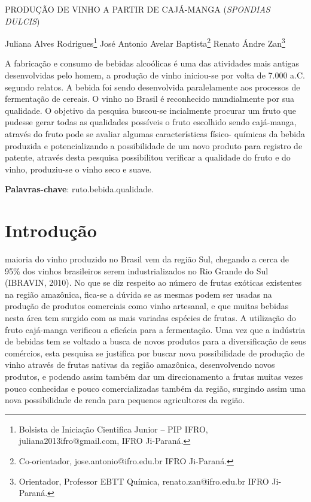 \documentclass[article,12pt,onesidea,4paper,english,brazil]{abntex2}
\begin{document}
	
	
	\frenchspacing 
	
	\begin{center}
		\LARGE PRODUÇÃO DE VINHO A PARTIR DE CAJÁ-MANGA (\textit{SPONDIAS DULCIS})
		
		\normalsize
		Juliana Alves Rodrigues\footnote{Bolsista de Iniciação Cientifica Junior – PIP IFRO, juliana2013ifro@gmail.com, IFRO Ji-Paraná.} 
		José Antonio Avelar Baptista\footnote{Co-orientador, jose.antonio@ifro.edu.br IFRO Ji-Paraná.} 
		Renato Ándre Zan\footnote{Orientador, Professor EBTT Química, renato.zan@ifro.edu.br IFRO Ji-Paraná.}  
	\end{center}
	
	\begin{resumoumacoluna}
		A fabricação e consumo de bebidas alcoólicas é uma das atividades mais antigas desenvolvidas pelo homem, a produção de vinho iniciou-se por volta de
		7.000 a.C. segundo relatos. A bebida foi sendo desenvolvida paralelamente aos processos de fermentação de cereais. O vinho no Brasil é reconhecido mundialmente por sua qualidade. O objetivo da pesquisa buscou-se incialmente procurar um fruto que pudesse gerar todas as qualidades possíveis o fruto escolhido sendo cajá-manga, através do fruto pode se avaliar algumas características físico- químicas da bebida produzida e potencializando a possibilidade de um novo produto para registro de patente, através desta pesquisa possibilitou verificar a qualidade do fruto e do vinho, produziu-se o vinho seco e suave.
		
		\vspace{\onelineskip}
		
		\noindent
		\textbf{Palavras-chave}: ruto.bebida.qualidade.
	\end{resumoumacoluna}
	
	\section*{Introdução}
	
	maioria do vinho produzido no Brasil vem da região Sul, chegando a cerca de 95\% dos vinhos brasileiros serem industrializados no Rio Grande do Sul (IBRAVIN, 2010). No que se diz respeito ao número de frutas exóticas existentes na região amazônica, fica-se a dúvida se as mesmas podem ser usadas na produção de produtos comerciais como vinho artesanal, e que muitas bebidas nesta área tem surgido com as mais variadas espécies de frutas. A utilização do fruto cajá-manga verificou a eficácia para a fermentação.
	Uma vez que a indústria de bebidas tem se voltado a busca de novos produtos para a diversificação de seus comércios, esta pesquisa se justifica por buscar nova possibilidade de produção de vinho através de frutas nativas da região amazônica, desenvolvendo novos produtos, e podendo assim também dar um direcionamento a frutas muitas vezes pouco conhecidas e pouco comercializadas também da região, surgindo assim uma nova possibilidade de renda para pequenos agricultores da região.
	
\end{document}
